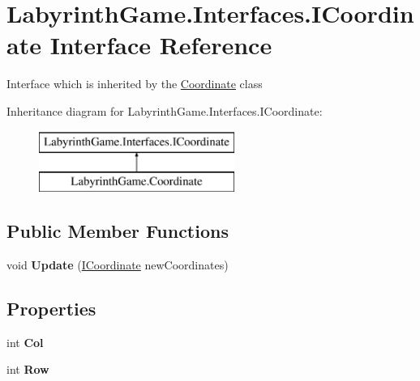 \hypertarget{interface_labyrinth_game_1_1_interfaces_1_1_i_coordinate}{\section{Labyrinth\+Game.\+Interfaces.\+I\+Coordinate Interface Reference}
\label{interface_labyrinth_game_1_1_interfaces_1_1_i_coordinate}
}


Interface which is inherited by the \hyperlink{class_labyrinth_game_1_1_coordinate}{Coordinate} class  


Inheritance diagram for Labyrinth\+Game.\+Interfaces.\+I\+Coordinate\+:\begin{figure}[H]
\begin{center}
\leavevmode
\includegraphics[height=2.000000cm]{interface_labyrinth_game_1_1_interfaces_1_1_i_coordinate}
\end{center}
\end{figure}
\subsection*{Public Member Functions}
\begin{DoxyCompactItemize}
\item 
\hypertarget{interface_labyrinth_game_1_1_interfaces_1_1_i_coordinate_ac898b2b5a6f3d7ba942d54c3815c97f8}{void {\bfseries Update} (\hyperlink{interface_labyrinth_game_1_1_interfaces_1_1_i_coordinate}{I\+Coordinate} new\+Coordinates)}\label{interface_labyrinth_game_1_1_interfaces_1_1_i_coordinate_ac898b2b5a6f3d7ba942d54c3815c97f8}

\end{DoxyCompactItemize}
\subsection*{Properties}
\begin{DoxyCompactItemize}
\item 
\hypertarget{interface_labyrinth_game_1_1_interfaces_1_1_i_coordinate_ae21b7a7e0ba1b797254b38088f76693a}{int {\bfseries Col}}\label{interface_labyrinth_game_1_1_interfaces_1_1_i_coordinate_ae21b7a7e0ba1b797254b38088f76693a}

\item 
\hypertarget{interface_labyrinth_game_1_1_interfaces_1_1_i_coordinate_aa75fdf8b6ec615d943533ba6b360a89c}{int {\bfseries Row}}\label{interface_labyrinth_game_1_1_interfaces_1_1_i_coordinate_aa75fdf8b6ec615d943533ba6b360a89c}

\end{DoxyCompactItemize}



